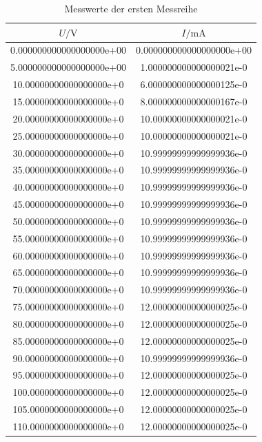 \begin{table}
  \centering
  \caption{Messwerte der ersten Messreihe}
  \label{tab:Reihe1}
  \begin{tabular}{|S[round-precision = 0]|S[round-precision = 3]|}
    \toprule
    $U/\si{\volt}$ & $I/\si{\milli \ampere}$ \\
    \midrule
    0.000000000000000000e+00 & 0.000000000000000000e+00\\
    5.000000000000000000e+00 & 1.000000000000000021e-0\\
    10.00000000000000000e+0 & 6.000000000000000125e-0\\
    15.00000000000000000e+0 & 8.000000000000000167e-0\\
    20.00000000000000000e+0 & 10.00000000000000021e-0\\
    25.00000000000000000e+0 & 10.00000000000000021e-0\\
    30.00000000000000000e+0 & 10.99999999999999936e-0\\
    35.00000000000000000e+0 & 10.99999999999999936e-0\\
    40.00000000000000000e+0 & 10.99999999999999936e-0\\
    45.00000000000000000e+0 & 10.99999999999999936e-0\\
    50.00000000000000000e+0 & 10.99999999999999936e-0\\
    55.00000000000000000e+0 & 10.99999999999999936e-0\\
    60.00000000000000000e+0 & 10.99999999999999936e-0\\
    65.00000000000000000e+0 & 10.99999999999999936e-0\\
    70.00000000000000000e+0 & 10.99999999999999936e-0\\
    75.00000000000000000e+0 & 12.00000000000000025e-0\\
    80.00000000000000000e+0 & 12.00000000000000025e-0\\
    85.00000000000000000e+0 & 12.00000000000000025e-0\\
    90.00000000000000000e+0 & 10.99999999999999936e-0\\
    95.00000000000000000e+0 & 12.00000000000000025e-0\\
    100.0000000000000000e+0 & 12.00000000000000025e-0\\
    105.0000000000000000e+0 & 12.00000000000000025e-0\\
    110.0000000000000000e+0 & 12.00000000000000025e-0\\

\end{tabular}
\end{table}
